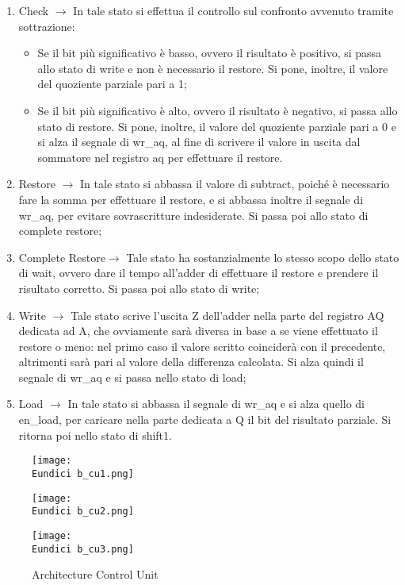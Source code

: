 \documentclass[12pt]{article}
\def \Eundici{Allegati/Esercizio11/}
\begin{document}
{\begin{enumerate}
    \item Check $\rightarrow$ In tale stato si effettua il controllo sul confronto avvenuto tramite sottrazione:
          \begin{itemize}
              \item Se il bit più significativo è basso, ovvero il risultato è positivo, si passa allo stato di write e non è necessario il restore. Si pone, inoltre, il valore del quoziente parziale pari a 1;
              \item Se il bit più significativo è alto, ovvero il risultato è negativo, si passa allo stato di restore.
                    Si pone, inoltre, il valore del quoziente parziale pari a 0 e si alza il segnale di wr\_aq, al fine di scrivere il valore in uscita dal sommatore nel registro aq per effettuare il restore.
          \end{itemize}
    \item Restore $\rightarrow$ In tale stato si abbassa il valore di subtract, poiché è necessario fare la somma per effettuare il restore, e si abbassa inoltre il segnale di wr\_aq, per evitare sovrascritture indesiderate. Si passa poi allo stato di complete restore;
    \item Complete Restore$\rightarrow$ Tale stato ha sostanzialmente lo stesso scopo dello stato di wait, ovvero dare il tempo all’adder di effettuare il restore e prendere il risultato corretto. Si passa poi allo stato di write;
    \item Write $\rightarrow$ Tale stato scrive l’uscita Z dell’adder nella parte del registro AQ dedicata ad A, che ovviamente sarà diversa in base a se viene effettuato il restore o meno: nel primo caso il valore scritto coinciderà con il precedente, altrimenti sarà pari al valore della differenza calcolata. Si alza quindi il segnale di wr\_aq e si passa nello stato di load;
    \item Load $\rightarrow$ In tale stato si abbassa il segnale di wr\_aq e si alza quello di en\_load, per caricare nella parte dedicata a Q il bit del risultato parziale. Si ritorna poi nello stato di shift1.
\end{enumerate}
\clearpage
\begin{figure}[ht!]
    \centering
    \texttt{[image: \\Eundici b\_cu1.png]}
\end{figure}
\begin{figure}[ht!]
    \centering
    \texttt{[image: \\Eundici b\_cu2.png]}
\end{figure}
\begin{figure}[ht!]
    \texttt{[image: \\Eundici b\_cu3.png]}
    \caption{Architecture Control Unit}
\end{figure}
\clearpage
}
\end{document}
